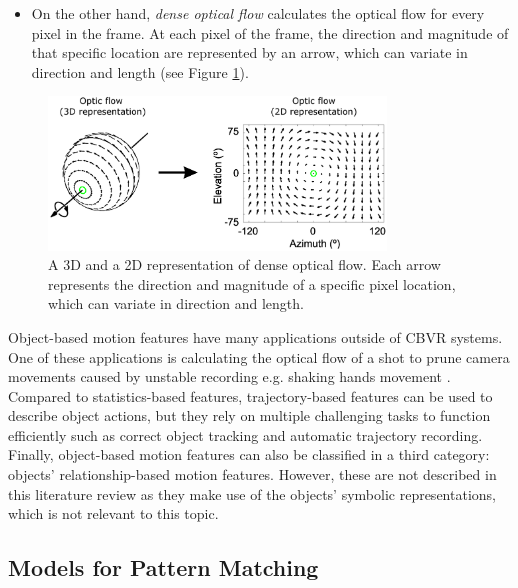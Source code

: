\begin{itemize}
\begin{itemize}
        \item On the other hand, \textit{dense optical flow} calculates the optical flow for every pixel in the frame. At each pixel of the frame, the direction and magnitude of that specific location are represented by an arrow, which can variate in direction and length (see Figure \ref{fig:dense_optical_flow_representation}).
        
    \end{itemize}

\end{itemize}

\begin{figure}[h] 
\centerline{\includegraphics[width=0.80\textwidth]{figures/litsurvey/dense_optical_flow_representation.png}}
\caption{\label{fig:dense_optical_flow_representation}A 3D and a 2D representation of dense optical flow. Each arrow represents the direction and magnitude of a specific pixel location, which can variate in direction and length.}
\end{figure}

Object-based motion features have many applications outside of CBVR systems. One of these applications is calculating the optical flow of a shot to prune camera movements caused by unstable recording e.g. shaking hands movement \cite{wang2016actionregonition}. Compared to statistics-based features, trajectory-based features can be used to describe object actions, but they rely on multiple challenging tasks to function efficiently such as correct object tracking and automatic trajectory recording. Finally, object-based motion features can also be classified in a third category: objects' relationship-based motion features. However, these are not described in this literature review as they make use of the objects' symbolic representations, which is not relevant to this topic.


\subsection{Models for Pattern Matching}
\label{sec:litsurvey-models-pattern-matching}

